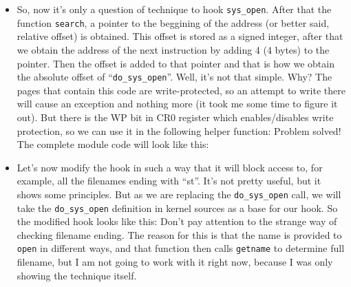 \documentclass[12pt]{book}
\begin{document}
\begin{itemize}
  \item So, now it's only a question of technique to hook
    \verb!sys_open!. After that the function \verb!search!, a pointer to the
    beggining of the address (or better said, relative offset) is
    obtained. This offset is stored as a signed integer, after that we obtain
    the address of the next instruction by adding 4 (4 bytes) to the
    pointer. Then the offset is added to that pointer and that is how we
    obtain the absolute offset of ``\verb!do_sys_open!''. Well, it's not that
    simple. Why? The pages that contain this code are write-protected, so an
    attempt to write there will cause an exception and nothing more (it took
    me some time to figure it out). But there is the WP bit in CR0 register
    which enables/disables write protection, so we can use it in the following
    helper function:
    Problem solved! The complete module code will look like this:
    

  \item Let's now modify the hook in such a way that it will block
    access to, for example, all the filenames ending with ``st''. It's
    not pretty useful, but it shows some principles. But as we are
    replacing the \verb!do_sys_open! call, we will take the
    \verb!do_sys_open! definition in kernel sources as a base for our
    hook. So the modified hook looks like
    this: Don't pay attention to the
    strange way of checking filename ending. The reason for this is
    that the name is provided to \verb!open! in different ways, and
    that function then calls \verb!getname! to determine full
    filename, but I am not going to work with it right now, because I
    was only showing the technique itself.
  \end{itemize}
\end{document}
